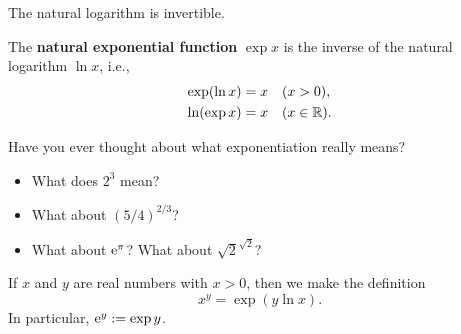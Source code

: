\setcounter{chapter}{7}
\setcounter{section}{3}
\setcounter{theorem}{0}
\setcounter{equation}{0}


\begin{theorem}
The natural logarithm is invertible.
\end{theorem}
\begin{definition}
The \textbf{natural exponential function} $\exp x $ is the inverse of the natural logarithm $\ln x$, i.e.,
\begin{align*}
\exp(\ln x) &= x \quad (x>0),\\
\ln (\exp x) &= x \quad (x\in\mathbb R).
\end{align*}
\end{definition}


\begin{remark}
Have you ever thought about what exponentiation really means?
\begin{itemize}
\item What does $2^3$ mean?

\ifdefined\SOLUTION
{}
\else
\vspace{1in}
\fi

\item What about $(5/4)^{2/3}$?
\ifdefined\SOLUTION
{}
\else
\vspace{1in}
\fi

\item What about $\mathrm{e}^\pi$? What about ${\sqrt 2}^{\sqrt 2}$?
\ifdefined\SOLUTION
{}
\else
\vspace{1in}
\fi
\end{itemize}
\end{remark}

\newpage

\begin{definition}
If $x$ and $y$ are real numbers with $x>0$, then we make the definition
\begin{equation*}
x^y = \exp(y\ln x).
\end{equation*}
In particular, $\mathrm{e}^y := \exp y$.
\end{definition}

